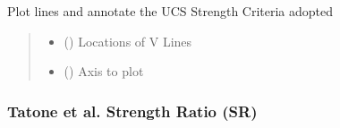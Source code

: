 \documentclass[letterpaper,10pt,english]{sphinxmanual}
\begin{document}
\begin{fulllineitems}
\begin{fulllineitems}
\label{\detokenize{pyrockmodulus:pyrockmodulus.pyrockmodulus.modulus_ratio.plot_v_lines}}
\pysigstartsignatures
{}
\pysigstopsignatures
\sphinxAtStartPar
Plot lines and annotate the UCS Strength Criteria adopted
\begin{quote}\begin{description}
\begin{itemize}
\item {} 
\sphinxAtStartPar
{} (\sphinxstyleliteralemphasis{\sphinxupquote{{[}}}\sphinxstyleliteralemphasis{\sphinxupquote{{]}}}) \textendash{} Locations of V Lines

\item {} 
\sphinxAtStartPar
{} () \textendash{} Axis to plot

\end{itemize}

\sphinxAtStartPar


\sphinxAtStartPar


\end{description}\end{quote}

\end{fulllineitems}


\end{fulllineitems}



\subsubsection{Tatone et al. \sphinxhyphen{} Strength Ratio (SR)}
\label{\detokenize{pyrockmodulus:module-0}}\label{\detokenize{pyrockmodulus:tatone-et-al-strength-ratio-sr}}
\end{document}
